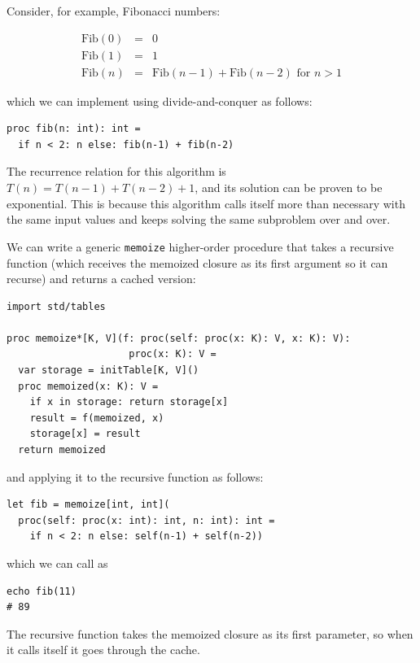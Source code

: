 \documentclass[justified, sixbynine]{tufte-book}
\def\ft{\small\tt}
\theoremstyle{plain}%
\newtheorem * {corollary}{Corollary}
\theoremstyle{definition}
\theoremstyle{remark}
\newtheorem * {remark}{Remark}
\newtheorem * {note}{Note}
\begin{document}
\begin{fullwidth}

Consider, for example, Fibonacci numbers:

\begin{eqnarray}
\textrm{Fib}(0)&=&0\\
\textrm{Fib}(1)&=&1\\
\textrm{Fib}(n)&=&\textrm{Fib}(n-1)+\textrm{Fib}(n-2)\textrm{ for }n>1
\end{eqnarray}

which we can implement using divide-and-conquer as follows:

\begin{lstlisting}
proc fib(n: int): int =
  if n < 2: n else: fib(n-1) + fib(n-2)
\end{lstlisting}

The recurrence relation for this algorithm is $T(n)=T(n-1)+T(n-2)+1$, and its solution can be proven to be exponential. This is because this algorithm calls itself more than necessary with the same input values and keeps solving the same subproblem over and over.


We can write a generic {\ft memoize} higher-order procedure that takes a recursive function (which receives the memoized closure as its first argument so it can recurse) and returns a cached version:
\begin{lstlisting}[caption={in file: {\ft nlib/memoize.nim}}]
import std/tables

proc memoize*[K, V](f: proc(self: proc(x: K): V, x: K): V):
                     proc(x: K): V =
  var storage = initTable[K, V]()
  proc memoized(x: K): V =
    if x in storage: return storage[x]
    result = f(memoized, x)
    storage[x] = result
  return memoized
\end{lstlisting}

and applying it to the recursive function as follows:

\begin{lstlisting}
let fib = memoize[int, int](
  proc(self: proc(x: int): int, n: int): int =
    if n < 2: n else: self(n-1) + self(n-2))
\end{lstlisting}

which we can call as

\begin{lstlisting}
echo fib(11)
# 89
\end{lstlisting}

The recursive function takes the memoized closure as its first parameter, so when it calls itself it goes through the cache.


\end{fullwidth}
\end{document}
